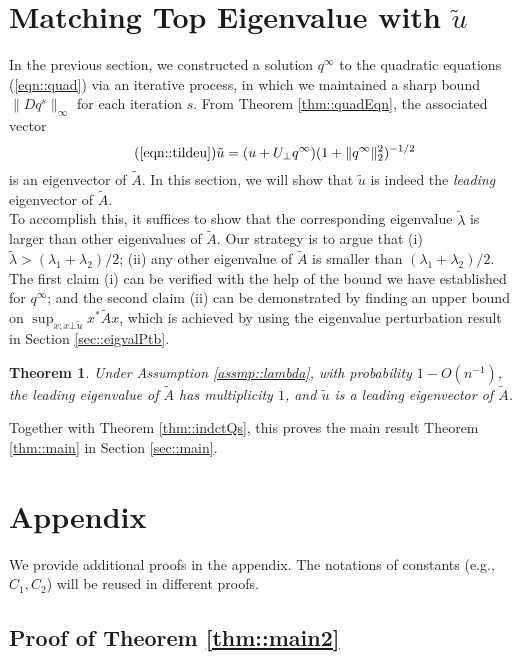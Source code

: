 \documentclass[12pt]{article}%
\theoremstyle{plain}%
\newtheorem{thm}{Theorem}[section]
\theoremstyle{remark}
\begin{document}
\section{Matching Top Eigenvalue with $\tilde{u}$}\label{sec::match}
In the previous section, we constructed a solution $q^\infty$ to the quadratic equations (\ref{eqn::quad}) via an iterative process, in which we maintained a sharp bound $\| Dq^s \|_\infty$ for each iteration $s$. From Theorem \ref{thm::quadEqn}, the associated vector
\begin{equation}\tag{\ref{eqn::tildeu}}
\tilde{u} = (u + U_\bot q^\infty )(1 + \| q^\infty \|_2^2)^{-1/2} 
\end{equation}
is an eigenvector of $\tilde{A}$. In this section, we will show that $\tilde{u}$ is indeed the \textit{leading} eigenvector of $\tilde{A}$.\\

To accomplish this, it suffices to show that the corresponding eigenvalue $\tilde{\lambda}$ is larger than other eigenvalues of $\tilde{A}$. Our strategy is to argue that (i) $\tilde{\lambda} > (\lambda_1 + \lambda_2)/2$; (ii) any other eigenvalue of $\tilde{A}$ is smaller than $(\lambda_1 + \lambda_2)/2$. The first claim (i) can be verified with the help of the bound we have established for $q^\infty$; and the second claim (ii) can be demonstrated by finding an upper bound on $\sup_{x: x \bot \tilde{u}} x^* \tilde{A} x$, which is achieved by using the eigenvalue perturbation result in Section \ref{sec::eigvalPtb}.

\begin{thm}\label{thm::match}
Under Assumption \ref{assmp::lambda}, with probability $1 - O(n^{-1})$, the leading eigenvalue of $\tilde{A}$ has multiplicity $1$, and $\tilde{u}$ is a leading eigenvector of $\tilde{A}$. 
\end{thm}

Together with Theorem \ref{thm::indctQs}, this proves the main result Theorem \ref{thm::main} in Section \ref{sec::main}.

\appendix
\section{Appendix}  
We provide additional proofs in the appendix. The notations of constants (e.g., $C_1,C_2$) will be reused in different proofs.
\subsection{Proof of Theorem \ref{thm::main2}}
\end{document}
